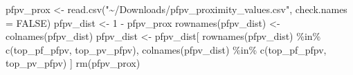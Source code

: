 \documentclass[
  11pt,
  oneside]{book}
\newenvironment{Shaded}{\begin{snugshade}}{\end{snugshade}}
\newcommand{\AttributeTok}[1]{\textcolor[rgb]{0.77,0.63,0.00}{#1}}
\newcommand{\ConstantTok}[1]{\textcolor[rgb]{0.00,0.00,0.00}{#1}}
\newcommand{\DecValTok}[1]{\textcolor[rgb]{0.00,0.00,0.81}{#1}}
\newcommand{\FunctionTok}[1]{\textcolor[rgb]{0.00,0.00,0.00}{#1}}
\newcommand{\NormalTok}[1]{#1}
\newcommand{\OtherTok}[1]{\textcolor[rgb]{0.56,0.35,0.01}{#1}}
\newcommand{\SpecialCharTok}[1]{\textcolor[rgb]{0.00,0.00,0.00}{#1}}
\newcommand{\StringTok}[1]{\textcolor[rgb]{0.31,0.60,0.02}{#1}}
\begin{document}
\begin{Shaded}
\begin{Highlighting}[]
\NormalTok{pfpv\_prox }\OtherTok{\textless{}{-}} \FunctionTok{read.csv}\NormalTok{(}\StringTok{"\textasciitilde{}/Downloads/pfpv\_proximity\_values.csv"}\NormalTok{, }\AttributeTok{check.names =} \ConstantTok{FALSE}\NormalTok{)}
\NormalTok{pfpv\_dist }\OtherTok{\textless{}{-}} \DecValTok{1} \SpecialCharTok{{-}}\NormalTok{ pfpv\_prox}
\FunctionTok{rownames}\NormalTok{(pfpv\_dist) }\OtherTok{\textless{}{-}} \FunctionTok{colnames}\NormalTok{(pfpv\_dist)}
\NormalTok{pfpv\_dist }\OtherTok{\textless{}{-}}\NormalTok{ pfpv\_dist[}
  \FunctionTok{rownames}\NormalTok{(pfpv\_dist) }\SpecialCharTok{\%in\%} \FunctionTok{c}\NormalTok{(top\_pf\_pfpv, top\_pv\_pfpv),}
  \FunctionTok{colnames}\NormalTok{(pfpv\_dist) }\SpecialCharTok{\%in\%} \FunctionTok{c}\NormalTok{(top\_pf\_pfpv, top\_pv\_pfpv)}
\NormalTok{]}
\FunctionTok{rm}\NormalTok{(pfpv\_prox)}
\end{Highlighting}
\end{Shaded}
\end{document}
